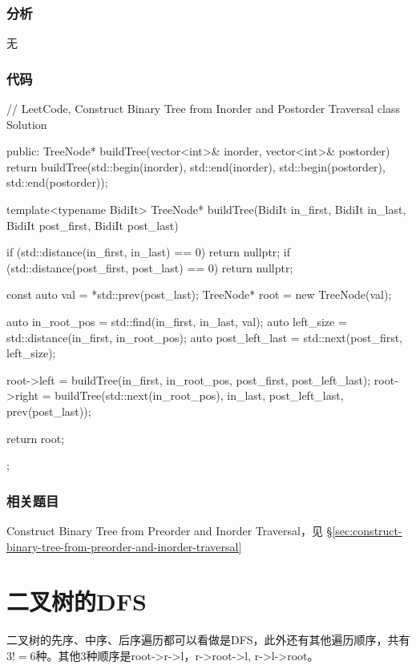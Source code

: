 \subsubsection{分析}
无


\subsubsection{代码}
\begin{Code}
// LeetCode, Construct Binary Tree from Inorder and Postorder Traversal
class Solution {
public:
    TreeNode* buildTree(vector<int>& inorder, vector<int>& postorder) {
        return buildTree(std::begin(inorder), std::end(inorder),
                std::begin(postorder), std::end(postorder));
    }

    template<typename BidiIt>
    TreeNode* buildTree(BidiIt in_first, BidiIt in_last,
            BidiIt post_first, BidiIt post_last) {
        if (std::distance(in_first, in_last) == 0) return nullptr;
        if (std::distance(post_first, post_last) == 0) return nullptr;

        const auto val = *std::prev(post_last);
        TreeNode* root = new TreeNode(val);

        auto in_root_pos = std::find(in_first, in_last, val);
        auto left_size = std::distance(in_first, in_root_pos);
        auto post_left_last = std::next(post_first, left_size);

        root->left = buildTree(in_first, in_root_pos, post_first, post_left_last);
        root->right = buildTree(std::next(in_root_pos), in_last, post_left_last,
                prev(post_last));

        return root;
    }
};
\end{Code}


\subsubsection{相关题目}
\begindot
\item Construct Binary Tree from Preorder and Inorder Traversal，见 \S \ref{sec:construct-binary-tree-from-preorder-and-inorder-traversal}
\myenddot


\section{二叉树的DFS} %
二叉树的先序、中序、后序遍历都可以看做是DFS，此外还有其他遍历顺序，共有$3!=6$种。其他3种顺序是root->r->l，r->root->l, r->l->root。


